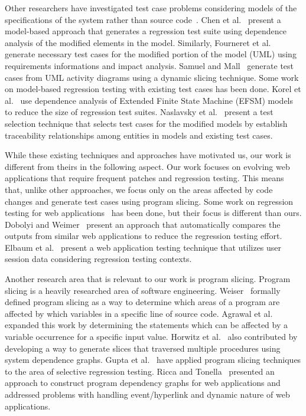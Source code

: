 Other researchers have investigated test case problems considering 
models of the specifications of the system rather than source 
code~\cite{chen07, korel02, fourneret11, naslavsky10, samuel09}. 
Chen et al.~\cite{chen07} present a model-based approach that generates 
a regression test suite using dependence analysis of the modified elements 
in the model. Similarly, Fourneret et al.~\cite{fourneret11} generate 
necessary test cases for the modified portion of the model (UML) using 
requirements informations and impact analysis. Samuel and 
Mall~\cite{samuel09} generate test cases from UML activity diagrams 
using a dynamic slicing technique. Some work on model-based regression 
testing with existing test cases has been done. Korel et al.~\cite{korel02} 
use dependence analysis of Extended Finite State Machine (EFSM) models 
to reduce the size of regression test suites. 
Naslavsky et al.~\cite{naslavsky10} present a test selection technique
that selects test cases for the modified models by establish traceability 
relationships among entities in models and existing test cases. 

While these existing techniques and approaches have motivated us, 
our work is different from theirs in the following aspect.
Our work focuses on evolving web applications that
require frequent patches and regression testing. This means that, unlike
other approaches, we focus only on the areas affected by code changes
and generate test cases using program slicing. Some work on regression
testing for web applications~\cite{dobolyi09, elbaum03} has been done,
but their focus is different than ours. Dobolyi and Weimer~\cite{dobolyi09} 
present an approach that automatically compares the outputs from similar 
web applications to reduce the regression testing effort.
Elbaum et al.~\cite{elbaum03} present a web application testing technique 
that utilizes user session data considering regression testing contexts.

Another research area that is relevant to our work is program slicing.
Program slicing is a heavily researched area of software engineering.
Weiser~\cite{weiser81} formally defined program slicing as a way to
determine which areas of a program are affected by which variables
in a specific line of source code. Agrawal et al.~\cite{agrawal90}
expanded this work by determining the statements which can be affected
by a variable occurrence for a specific input value.
Horwitz et al.~\cite{horwitz88, horwitz90} also contributed by developing a way
to generate slices that traversed multiple procedures using system
dependence graphs. Gupta et al.~\cite{gupta92nov, gupta96jun} have
applied program slicing techniques to the area of selective regression
testing. Ricca and Tonella~\cite{ricca02} presented an approach to construct
program dependency graphs for web applications and addressed problems with
handling event/hyperlink and dynamic nature of web applications.   

